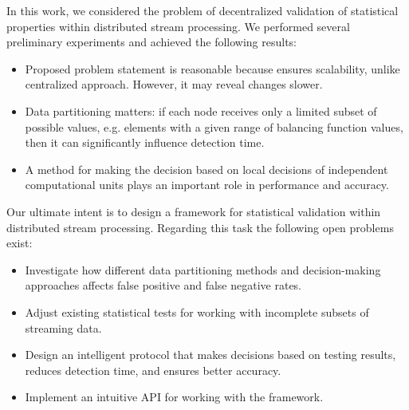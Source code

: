 \label {fs-short-conclusion}

In this work, we considered the problem of decentralized validation of statistical properties within distributed stream processing. We performed several preliminary experiments and achieved the following results:
\begin{itemize}
    \item Proposed problem statement is reasonable because ensures scalability, unlike centralized approach. However, it may reveal changes slower.
    \item Data partitioning matters: if each node receives only a limited subset of possible values, e.g. elements with a given range of balancing function values, then it can significantly influence detection time.
    \item A method for making the decision based on local decisions of independent computational units plays an important role in performance and accuracy.
\end{itemize}

Our ultimate intent is to design a framework for statistical validation within distributed stream processing. Regarding this task the following open problems exist:

\begin{itemize}
    \item Investigate how different data partitioning methods and decision-making approaches affects false positive and false negative rates.
    \item Adjust existing statistical tests for working with incomplete subsets of streaming data.
    \item Design an intelligent protocol that makes decisions based on testing results, reduces detection time, and ensures better accuracy.
    \item Implement an intuitive API for working with the framework.
\end{itemize}